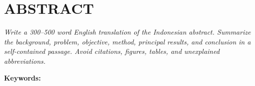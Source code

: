 \cleardoublepage
\chapter*{ABSTRACT}
\thispagestyle{fancy}

\textit{Write a 300--500 word English translation of the Indonesian abstract. Summarize
the background, problem, objective, method, principal results, and conclusion in a
self-contained passage. Avoid citations, figures, tables, and unexplained abbreviations.}

\vspace{1cm}
\noindent\textbf{Keywords:} \Keywords